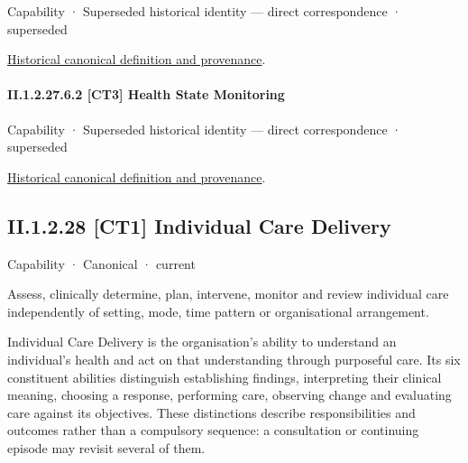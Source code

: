 \label{element:615f93d05fbb4a8481f07778bd4f4803}
{\small Capability · Superseded historical identity — direct correspondence · superseded}\par
\href{../../../../continuum/strategy/capability/615f93d05fbb4a8481f07778bd4f4803.md}{Historical canonical definition and provenance}.\par
\paragraph*{II.1.2.27.6.2 [CT3] Health State Monitoring}
\label{navigation:II.1.2.27.6.2}

\label{element:346f024f74b447a8b6056b9d521837ff}
{\small Capability · Superseded historical identity — direct correspondence · superseded}\par
\href{../../../../continuum/strategy/capability/346f024f74b447a8b6056b9d521837ff.md}{Historical canonical definition and provenance}.\par
\subsection*{II.1.2.28 [CT1] Individual Care Delivery}
\label{navigation:II.1.2.28}

\label{element:b964a11cde594318aa14ff935414158a}
{\small Capability · Canonical · current}\par

Assess, clinically determine, plan, intervene, monitor and review individual care independently of setting, mode, time pattern or organisational arrangement.



Individual Care Delivery is the organisation's ability to understand an individual's health and act on that understanding through purposeful care. Its six constituent abilities distinguish establishing findings, interpreting their clinical meaning, choosing a response, performing care, observing change and evaluating care against its objectives. These distinctions describe responsibilities and outcomes rather than a compulsory sequence: a consultation or continuing episode may revisit several of them.



